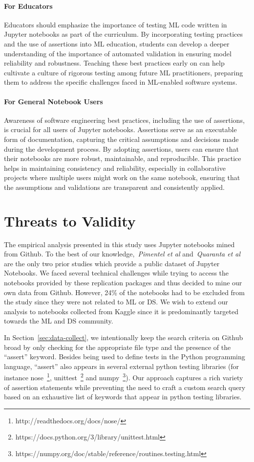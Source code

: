 \paragraph{\textbf{For Educators}} Educators should emphasize the importance of testing ML code written in Jupyter notebooks as part of the curriculum. By incorporating testing practices and the use of assertions into ML education, students can develop a deeper understanding of the importance of automated validation in ensuring model reliability and robustness. Teaching these best practices early on can help cultivate a culture of rigorous testing among future ML practitioners, preparing them to address the specific challenges faced in ML-enabled software systems.

\paragraph{\textbf{For General Notebook Users}} Awareness of software engineering best practices, including the use of assertions, is crucial for all users of Jupyter notebooks. Assertions serve as an executable form of documentation, capturing the critical assumptions and decisions made during the development process. By adopting assertions, users can ensure that their notebooks are more robust, maintainable, and reproducible. This practice helps in maintaining consistency and reliability, especially in collaborative projects where multiple users might work on the same notebook, ensuring that the assumptions and validations are transparent and consistently applied.

\section{Threats to Validity}\label{sec:threats}

The empirical analysis presented in this study uses Jupyter notebooks mined from Github. To the best of our knowledge,~\emph{Pimentel et al} and~\emph{Quaranta et al} are the only two prior studies which provide a public dataset of Jupyter Notebooks. We faced several technical challenges while trying to access the notebooks provided by these replication packages and thus decided to mine our own data from Github. However, 24\% of the notebooks had to be excluded from the study since they were not related to ML or DS. We wish to extend our analysis to notebooks collected from Kaggle since it is predominantly targeted towards the ML and DS community.

In Section~\ref{sec:data-collect}, we intentionally keep the search criteria on Github broad by only checking for the appropriate file type and the presence of the ``assert'' keyword. Besides being used to define tests in the Python programming language, ``assert'' also appears in several external python testing libraries (for instance nose~\footnote{http://readthedocs.org/docs/nose/}, unittest~\footnote{https://docs.python.org/3/library/unittest.html} and numpy~\footnote{https://numpy.org/doc/stable/reference/routines.testing.html}). Our approach captures a rich variety of assertion statements while preventing the need to craft a custom search query based on an exhaustive list of keywords that appear in python testing libraries.

